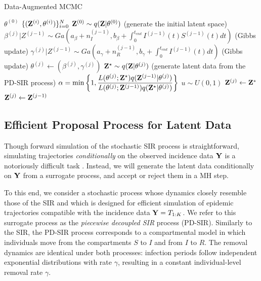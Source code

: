 \documentclass[11pt]{article}
\begin{document}
	\begin{algorithm}
		\caption{Data-Augmented MCMC}
		\label{alg:DA-MCMC}
		\begin{algorithmic}
			\REQUIRE $\theta^{(0)}$
			\RETURN $\{(\mathbf{Z}^{(i)}, \theta^{(i)})\}_{i=0}^N$ 
			\STATE $\mathbf{Z}^{(0)} \sim q(\mathbf{Z}|\theta^{(0)})$ (generate the initial latent space)
			\STATE $\beta^{(j)}|Z^{(j - 1)} \sim Ga\left( a_{\beta} + n_I^{(j - 1)}, b_{\beta} + \int_{0}^{t_{end}} I^{(j - 1)}(t)S^{(j - 1)}(t)dt\right)$ (Gibbs update)
			\STATE $\gamma^{(j)}|Z^{(j-1)} \sim Ga\left( a_{\gamma} + n_R^{(j - 1)}, b_{\gamma} + \int_{0}^{t_{end}} I^{(j - 1)}(t) dt\right)$ (Gibbs update)
			\STATE $\theta^{(j)} \leftarrow (\beta^{(j)}, \gamma^{(j)})$
			\STATE $\mathbf{Z}^\star \sim q(\mathbf{Z}|\theta^{(j)})$ (generate latent data from the PD-SIR process)
			\STATE $\alpha = \min\left\lbrace 1, \dfrac{L(\theta^{(j)}; \mathbf{Z}^\star)q(\mathbf{Z}^{(j - 1)}|\theta^{(j)})}{L(\theta^{(j)}; \mathbf{Z}^{(j - 1)})q(\mathbf{Z}^\star|\theta^{(j)})}\right\rbrace  $
			\STATE $u \sim U(0,1)$
			\STATE $\mathbf{Z}^{(j)} \leftarrow \mathbf{Z}^*$			
			\ELSE
			\STATE $\mathbf{Z}^{(j)} \leftarrow \mathbf{Z}^{(j - 1)}$
			\ENDIF
			\ENDFOR
		\end{algorithmic}
	\end{algorithm}
	
	\subsection{Efficient Proposal Process for Latent Data}
	\label{sec:pds}
	Though forward simulation of the stochastic SIR process is straightforward, 
	simulating trajectories \textit{conditionally} on the observed incidence data $\mathbf{Y}$ is a notoriously difficult task \cite{Hobolth.2009}. Instead, we will generate the latent data conditionally on $\mathbf{Y}$ from a surrogate process, and accept or reject them in a MH step.
	
	To this end, we consider a stochastic process whose dynamics closely resemble those of the SIR  and which is designed for efficient simulation of epidemic trajectories compatible with the incidence data $\mathbf{Y} = T_{1:K}$. We refer to this surrogate process as the \textit{piecewise decoupled SIR} process (PD-SIR).
	Similarly to the SIR, the PD-SIR process corresponds to a compartmental model in which individuals move from the compartments $S$ to $I$ and from $I$ to $R$.
	The removal dynamics are identical under both processes: infection periods follow independent exponential distributions with rate $\gamma$, resulting in a constant individual-level removal rate $\gamma$. 
	
\end{document}

